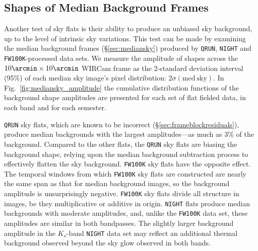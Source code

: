 \documentclass[iop]{emulateapj}
\newcommand{\Fig}[1]{Fig.~\ref{fig:#1}}  %
\newcommand{\Sec}[1]{\S\ref{sec:#1}}  %
\begin{document}
\subsection{Shapes of Median Background Frames}
\label{sec:medianskyshapes}

Another test of sky flats is their ability to produce an unbiased sky background, up to the level of intrinsic sky variations.
This test can be made by examining the median background frames (\Sec{mediansky}) produced by \texttt{QRUN}, \texttt{NIGHT} and \texttt{FW100K}-processed data sets.
We measure the amplitude of shapes across the $10\arcmin \times 10\arcmin$ WIRCam frame as the 2-standard deviation interval (95\%) of each median sky image's pixel distribution: $2 \sigma(\mathrm{med~sky})$.
In \Fig{mediansky_amplitude} the cumulative distribution functions of the background shape amplitudes are presented for each set of flat fielded data, in each band and for each semester.

\texttt{QRUN} sky flats, which are known to be incorrect (\Sec{frameblockresiduals}), produce median backgrounds with the largest amplitudes---as much as 3\% of the background.
Compared to the other flats, the \texttt{QRUN} sky flats are biasing the background shape, relying upon the median background subtraction process to effectively flatten the sky background.
\texttt{FW100K} sky flats have the opposite effect.
The temporal windows from which \texttt{FW100K} sky flats are constructed are nearly the same span as that for median background images, so the background amplitude is unsurprisingly negative.
\texttt{FW100K} sky flats divide all structure in images, be they multiplicative or additive in origin.
\texttt{NIGHT} flats produce median backgrounds with moderate amplitudes, and, unlike the \texttt{FW100K} data set, these amplitudes are similar in both bandpasses.
The slightly larger background amplitude in the $K_s$-band \texttt{NIGHT} data set may reflect an additional thermal background observed beyond the sky glow observed in both bands.
\end{document}
